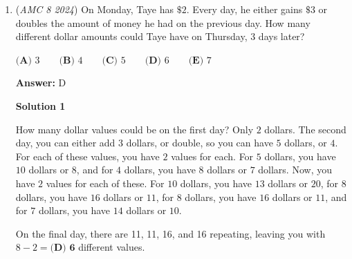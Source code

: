\begin{enumerate}
 -Benedict T (countmath1)

 


 


 



\textbf{Solution 4}

Since the rectangle is a 3x7 grid, its total area (or the number of 1x1 squares) is 21. To minimize the number of 1x1 squares used, we begin by filling the area with larger shapes. Specifically, we can use two 2x2 squares, each covering 4 squares, and two 1x4 rectangles, each also covering 4 squares. This gives us a total of 4+4=84+4=8 squares filled by larger shapes.After filling 16 squares, we have 5 squares left. We can then fill in 5 additional 1x1 squares, leaving us with a total of 5 1x1 squares.

 Thus, the least number of 1x1 squares required is $\boxed{\textbf{(E)\ 5}}$. -AADHYA2012

 


 Youtube Link ⬇️

 


 


	\item (\textit{AMC 8 2024}) On Monday, Taye has $\$2$. Every day, he either gains $\$3$ or doubles the amount of money he had on the previous day. How many different dollar amounts could Taye have on Thursday, $3$ days later?


 $\textbf{(A) } 3\qquad\textbf{(B) } 4\qquad\textbf{(C) } 5\qquad\textbf{(D) } 6\qquad\textbf{(E) } 7$

 \textbf{Answer: }D



\textbf{Solution 1}

How many dollar values could be on the first day? Only $2$ dollars. The second day, you can either add $3$ dollars, or double, so you can have $5$ dollars, or $4$. For each of these values, you have $2$ values for each. For $5$ dollars, you have $10$ dollars or $8$, and for $4$ dollars, you have $8$ dollars or $7$ dollars. Now, you have $2$ values for each of these. For $10$ dollars, you have $13$ dollars or $20$, for $8$ dollars, you have $16$ dollars or $11$, for $8$ dollars, you have $16$ dollars or $11$, and for $7$ dollars, you have $14$ dollars or $10$.

 On the final day, there are 11, 11, 16, and 16 repeating, leaving you with $8-2 = \boxed{\textbf{(D)\ 6}}$ different values.


\end{enumerate}

